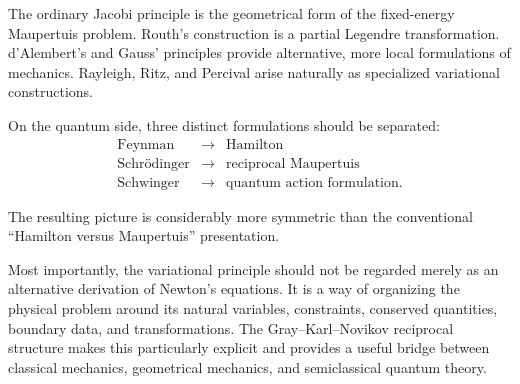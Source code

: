 The ordinary Jacobi principle is the geometrical form of the fixed-energy Maupertuis problem.  Routh's construction is a partial Legendre transformation.  d'Alembert's and Gauss' principles provide alternative, more local formulations of mechanics.  Rayleigh, Ritz, and Percival arise naturally as specialized variational constructions.

On the quantum side, three distinct formulations should be separated:
\begin{equation}
\boxed{
\begin{array}{ccc}
\text{Feynman}
&\longrightarrow&
\text{Hamilton}
\\[2mm]
\text{Schr\"odinger}
&\longrightarrow&
\text{reciprocal Maupertuis}
\\[2mm]
\text{Schwinger}
&\longrightarrow&
\text{quantum action formulation}.
\end{array}}
\end{equation}

The resulting picture is considerably more symmetric than the conventional ``Hamilton versus Maupertuis'' presentation.

Most importantly, the variational principle should not be regarded merely as an alternative derivation of Newton's equations.  It is a way of organizing the physical problem around its natural variables, constraints, conserved quantities, boundary data, and transformations.  The Gray--Karl--Novikov reciprocal structure makes this particularly explicit and provides a useful bridge between classical mechanics, geometrical mechanics, and semiclassical quantum theory.

